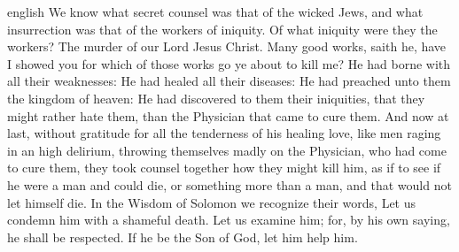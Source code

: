 {english}
{\noindent We know what secret counsel was that of the wicked Jews, and what insurrection was that of the workers of iniquity. Of what iniquity were they the workers? The murder of our Lord Jesus Christ. Many good works, saith he, have I showed you for which of those works go ye about to kill me? He had borne with all their weaknesses: He had healed all their diseases: He had preached unto them the kingdom of heaven: He had discovered to them their iniquities, that they might rather hate them, than the Physician that came to cure them. And now at last, without gratitude for all the tenderness of his healing love, like men raging in an high delirium, throwing themselves madly on the Physician, who had come to cure them, they took counsel together how they might kill him, as if to see if he were a man and could die, or something more than a man, and that would not let himself die. In the Wisdom of Solomon we recognize their words, Let us condemn him with a shameful death. Let us examine him; for, by his own saying, he shall be respected. If he be the Son of God, let him help him.}